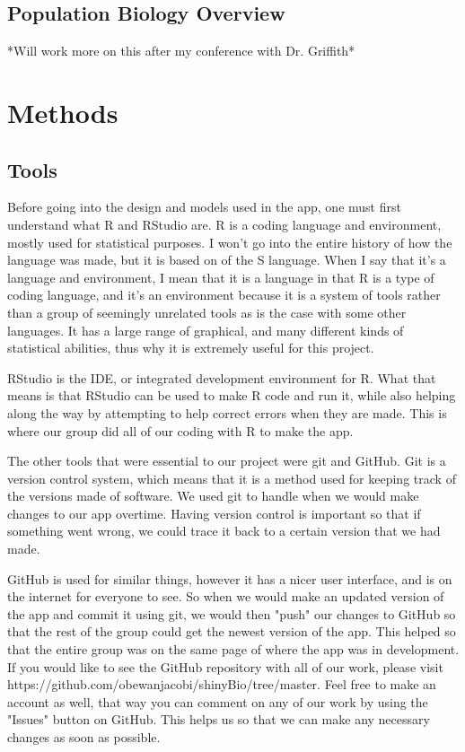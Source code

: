 \documentclass{article}\usepackage[]{graphicx}\usepackage[]{color}
\begin{document}
\subsection{Population Biology Overview}

*Will work more on this after my conference with Dr. Griffith*

\section{Methods}

\subsection{Tools}

Before going into the design and models used in the app, one must first understand what R and RStudio are. R is a coding language and environment, mostly used for statistical purposes. I won't go into the entire history of how the language was made, but it is based on of the S language. When I say that it's a language and environment, I mean that it is a language in that R is a type of coding language, and it's an environment because it is a system of tools rather than a group of seemingly unrelated tools as is the case with some other languages. It has a large range of graphical, and many different kinds of statistical abilities, thus why it is extremely useful for this project.

RStudio is the IDE, or integrated development environment for R. What that means is that RStudio can be used to make R code and run it, while also helping along the way by attempting to help correct errors when they are made. This is where our group did all of our coding with R to make the app. 

The other tools that were essential to our project were git and GitHub. Git is a version control system, which means that it is a method used for keeping track of the versions made of software. We used git to handle when we would make changes to our app overtime. Having version control is important so that if something went wrong, we could trace it back to a certain version that we had made. 

GitHub is used for similar things, however it has a nicer user interface, and is on the internet for everyone to see. So when we would make an updated version of the app and commit it using git, we would then "push" our changes to GitHub so that the rest of the group could get the newest version of the app. This helped so that the entire group was on the same page of where the app was in development. If you would like to see the GitHub repository with all of our work, please visit https://github.com/obewanjacobi/shinyBio/tree/master. Feel free to make an account as well, that way you can comment on any of our work by using the "Issues" button on GitHub. This helps us so that we can make any necessary changes as soon as possible.
\end{document}

